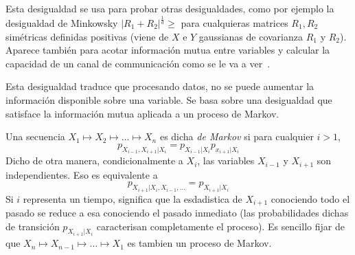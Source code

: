 
Esta desigualdad se usa para  probar otras desigualdades, como por ejemplo la
desigualdad de  Minkowsky $|R_1 +  R_2|^{\frac1d} \ge $ para  cualquieras matrices
$R_1,  R_2$ sim\'etricas  definidas positivas  (viene de  $X$ e  $Y$  gaussianas de
covarianza $R_1$  y $R_2$).  Aparece  tambi\'en para acotar  informaci\'on mutua
entre variables y  calcular la capacidad de un canal  de communicaci\'on como se
le va a ver~\cite{CovTho06, DemCov91, Rio07, Joh04}.





Esta  desigualdad  traduce  que  procesando  datos,  no  se  puede  aumentar  la
informaci\'on disponible sobre  una variable. Se basa sobre  una desigualdad que
satisface la informaci\'on mutua aplicada a un proceso de Markov.

\begin{definicion}
  Una secuencia  $X_1 \mapsto X_2 \mapsto  \ldots \mapsto X_n$ es  dicha {\it de
    Markov}   si   para  cualquier   $i   >   1$,
  \[
  p_{X_{i-1},X_{i+1}|X_i} = p_{X_{i-1}|X_i} p_{x_{i+1}|X_i}
  \]
  Dicho  de otra  manera, condicionalmente  a $X_i$,  las variables  $X_{i-1}$ y
  $X_{i+1}$       son       independientes.        Eso      es       equivalente
  a
  \[
  p_{X_{i+1}|X_i,X_{i-1},\ldots} = p_{X_{i+1}|X_i}
  \]
  Si  $i$  representa un  tiempo,  significa  que  la esdadistica  de  $X_{i+1}$
  conociendo todo el pasado se reduce  a esa conociendo el pasado inmediato (las
  probabilidades   dichas   de   transici\'on   $p_{X_{i+1}|X_i}$   caracterisan
  completamente  el proceso).   Es sencillo  fijar de  que $X_n  \mapsto X_{n-1}
  \mapsto \ldots \mapsto X_1$ es tambien un proceso de Markov.
\end{definicion}

